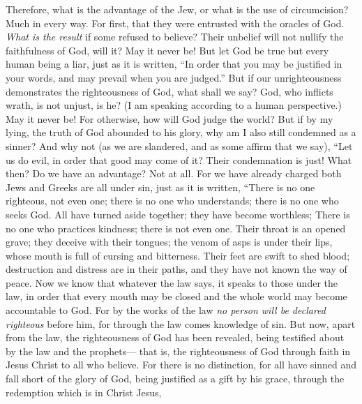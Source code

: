 \begin{biblechapter} %
 Therefore, what is the advantage of the Jew, or what is the use of circumcision?
\verse Much in every way. For first, that they were entrusted with the oracles of God.
\verse \textit{What is the result} if some refused to believe? Their unbelief will not nullify the faithfulness of God, will it?
\verse May it never be! But let God be true but every human being a liar, just as it is written, “In order that you may be justified in your words, 
and may prevail when you are judged.”
\verse But if our unrighteousness demonstrates the righteousness of God, what shall we say? God, who inflicts wrath, is not unjust, is he? (I am speaking according to a human perspective.)
\verse May it never be! For otherwise, how will God judge the world?
\verse But if by my lying, the truth of God abounded to his glory, why am I also still condemned as a sinner?
\verse And why not (as we are slandered, and as some affirm that we say), “Let us do evil, in order that good may come of it? Their condemnation is just!
 What then? Do we have an advantage? Not at all. For we have already charged both Jews and Greeks are all under sin,
\verse just as it is written,
\verse “There is no one righteous, not even one;
\verse there is no one who understands; 
there is no one who seeks God.
\verse All have turned aside together; they have become worthless; 
There is no one who practices kindness; 
there is not even one.
\verse Their throat is an opened grave; 
they deceive with their tongues; 
the venom of asps is under their lips,
\verse whose mouth is full of cursing and bitterness.
\verse Their feet are swift to shed blood;
\verse destruction and distress are in their paths,
\verse and they have not known the way of peace.
\verse Now we know that whatever the law says, it speaks to those under the law, in order that every mouth may be closed and the whole world may become accountable to God.
\verse For by the works of the law \textit{no person will be declared righteous} before him, for through the law comes knowledge of sin.
 But now, apart from the law, the righteousness of God has been revealed, being testified about by the law and the prophets—
\verse that is, the righteousness of God through faith in Jesus Christ to all who believe. For there is no distinction,
\verse for all have sinned and fall short of the glory of God,
\verse being justified as a gift by his grace, through the redemption which is in Christ Jesus,

\end{biblechapter}
